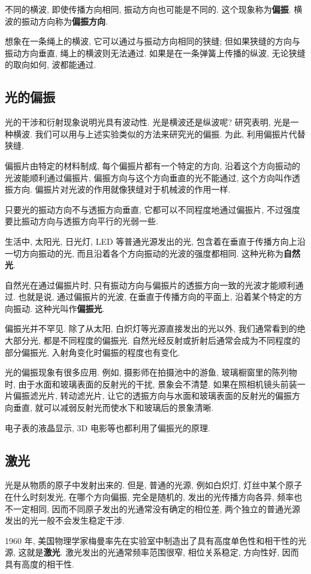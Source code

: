 \documentclass[UTF8,openany,fontset=fandol]{ctexbook}
\theoremstyle{chinesetextbook}
\begin{document}
不同的横波, 即使传播方向相同, 振动方向也可能是不同的. 这个现象称为\textbf{偏振}. 横波的振动方向称为\textbf{偏振方向}.

想象在一条绳上的横波, 它可以通过与振动方向相同的狭缝; 但如果狭缝的方向与振动方向垂直, 绳上的横波则无法通过. 如果是在一条弹簧上传播的纵波, 无论狭缝的取向如何, 波都能通过.
\subsection{光的偏振}
光的干涉和衍射现象说明光具有波动性. 光是横波还是纵波呢? 研究表明, 光是一种横波. 我们可以用与上述实验类似的方法来研究光的偏振. 为此, 利用偏振片代替狭缝.

偏振片由特定的材料制成, 每个偏振片都有一个特定的方向, 沿着这个方向振动的光波能顺利通过偏振片, 偏振方向与这个方向垂直的光不能通过, 这个方向叫作透振方向. 偏振片对光波的作用就像狭缝对于机械波的作用一样.

只要光的振动方向不与透振方向垂直, 它都可以不同程度地通过偏振片, 不过强度要比振动方向与透振方向平行的光弱一些.

生活中, 太阳光, 日光灯, LED 等普通光源发出的光, 包含着在垂直于传播方向上沿一切方向振动的光, 而且沿着各个方向振动的光波的强度都相同. 这种光称为\textbf{自然光}.

自然光在通过偏振片时, 只有振动方向与偏振片的透振方向一致的光波才能顺利通过. 也就是说, 通过偏振片的光波, 在垂直于传播方向的平面上, 沿着某个特定的方向振动. 这种光叫作\textbf{偏振光}.

偏振光并不罕见. 除了从太阳, 白炽灯等光源直接发出的光以外, 我们通常看到的绝大部分光, 都是不同程度的偏振光. 自然光经反射或折射后通常会成为不同程度的部分偏振光, 入射角变化时偏振的程度也有变化.

光的偏振现象有很多应用. 例如, 摄影师在拍摄池中的游鱼, 玻璃橱窗里的陈列物时, 由于水面和玻璃表面的反射光的干扰, 景象会不清楚. 如果在照相机镜头前装一片偏振滤光片, 转动滤光片, 让它的透振方向与水面和玻璃表面的反射光的偏振方向垂直, 就可以减弱反射光而使水下和玻璃后的景象清晰.

电子表的液晶显示, 3D 电影等也都利用了偏振光的原理.
\subsection{激光}
光是从物质的原子中发射出来的. 但是, 普通的光源, 例如白炽灯, 灯丝中某个原子在什么时刻发光, 在哪个方向偏振, 完全是随机的, 发出的光传播方向各异, 频率也不一定相同, 因而不同原子发出的光通常没有确定的相位差, 两个独立的普通光源发出的光一般不会发生稳定干涉.

1960 年, 美国物理学家梅曼率先在实验室中制造出了具有高度单色性和相干性的光源, 这就是\textbf{激光}. 激光发出的光通常频率范围很窄, 相位关系稳定, 方向性好, 因而具有高度的相干性.
\end{document}
